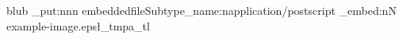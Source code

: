 \documentclass{article}
\begin{document}
blub
\ExplSyntaxOn
\pdfdict_put:nnn  {embeddedfile}{Subtype}{\pdftool_name:n{application/postscript}}
\pdffile_embed:nN {example-image.eps}\l_tmpa_tl
\ExplSyntaxOff
\end{document}

